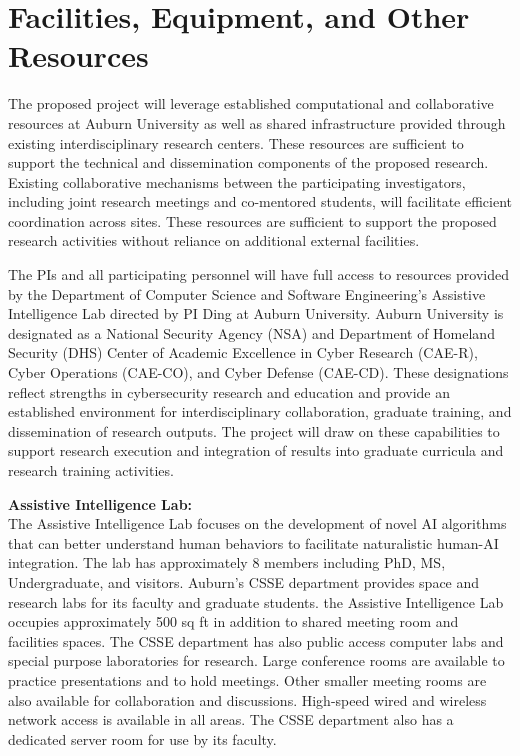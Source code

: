 \section*{Facilities, Equipment, and Other Resources}

The proposed project will leverage established computational and collaborative resources at Auburn University as well as shared infrastructure provided through existing interdisciplinary research centers. These resources are sufficient to support the technical and dissemination components of the proposed research. Existing collaborative mechanisms between the participating investigators, including joint research meetings and co-mentored students, will facilitate efficient coordination across sites. These resources are sufficient to support the proposed research activities without reliance on additional external facilities.

The PIs and all participating personnel will have full access to resources provided by the Department of Computer Science and Software Engineering's Assistive Intelligence Lab directed by PI Ding at Auburn University. Auburn University is designated as a National Security Agency (NSA) and Department of Homeland Security (DHS) Center of Academic Excellence in Cyber Research (CAE-R), Cyber Operations (CAE-CO), and Cyber Defense (CAE-CD). These designations reflect strengths in cybersecurity research and education and provide an established environment for interdisciplinary collaboration, graduate training, and dissemination of research outputs. The project will draw on these capabilities to support research execution and integration of results into graduate curricula and research training activities.

\noindent\textbf{Assistive Intelligence Lab:} \\
The Assistive Intelligence Lab focuses on the development of novel AI algorithms that can better understand human behaviors to facilitate naturalistic human-AI integration. The lab has approximately 8 members including PhD, MS, Undergraduate, and visitors. Auburn's CSSE department provides space and research labs for its faculty and graduate students. the Assistive Intelligence Lab occupies approximately 500 sq ft in addition to shared meeting room and facilities spaces. The CSSE department has also public access computer labs and special purpose laboratories for research. Large conference rooms are available to practice presentations and to hold meetings. Other smaller meeting rooms are also available for collaboration and discussions. High-speed wired and wireless network access is available in all areas. The CSSE department also has a dedicated server room for use by its faculty.

